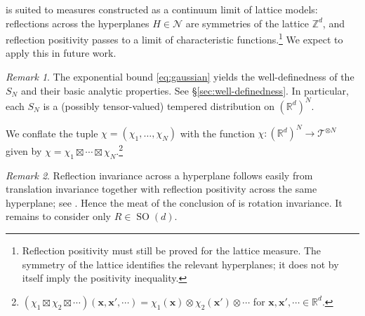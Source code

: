 \documentclass[11pt, letterpaper, reqno]{amsart}
\theoremstyle{definition}
\theoremstyle{remark}
\newtheorem*{remark*}{Remark}
\newcommand{\bbR}{\mathbb{R}}
\newcommand{\bbZ}{\mathbb{Z}}
\newcommand{\calN}{\mathcal{N}}
\newcommand{\calT}{\mathcal{T}}
\newcommand{\bfx}{\mathbf{x}}
\begin{document}
 is suited to measures constructed as a continuum limit of lattice models: reflections across the hyperplanes $H\in\calN$ are symmetries of the lattice $\bbZ^d$, and reflection positivity passes to a limit of characteristic functions.\footnote{Reflection positivity must still be proved for the lattice measure. The symmetry of the lattice identifies the relevant hyperplanes; it does not by itself imply the positivity inequality.} We expect to apply this in future work.


\begin{remark*}
    The exponential bound \cref{eq:gaussian} yields the well-definedness of the $S_N$ and their basic analytic properties. See \S\ref{sec:well-definedness}. In particular, each $S_N$ is a (possibly tensor-valued) tempered distribution on $(\bbR^d)^N$. 
    
    We conflate the tuple $\chi=(\chi_1,\dots,\chi_N)$ with the function $\chi:(\bbR^d)^N\to \calT^{\otimes N}$ given by $\chi=\chi_1\boxtimes \cdots \boxtimes \chi_N$.\footnote{$(\chi_1\boxtimes \chi_2\boxtimes \cdots )(\bfx,\bfx',\cdots)=\chi_1(\bfx)\otimes\chi_2(\bfx')\otimes\cdots$ for $\bfx,\bfx',\cdots \in \bbR^d$.} 
\end{remark*}
\begin{remark*}
    Reflection invariance across a hyperplane follows easily from translation invariance together with reflection positivity across the same hyperplane; see . Hence the meat of the conclusion of  is rotation invariance.
    It remains to consider only $R\in \operatorname{SO}(d)$.
\end{remark*}
\end{document}
